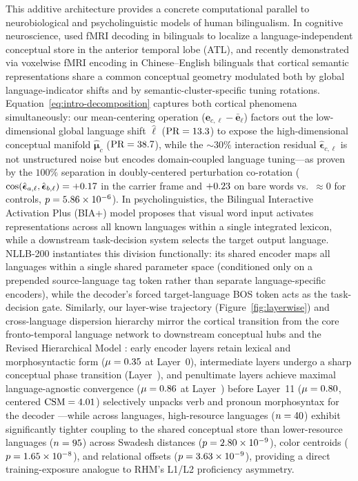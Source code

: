This additive architecture provides a concrete computational parallel to neurobiological and psycholinguistic models of human bilingualism.
In cognitive neuroscience, \citet{correia2014} used fMRI decoding in bilinguals to localize a language-independent conceptual store in the anterior temporal lobe (ATL), and \citet{deniz2025} recently demonstrated via voxelwise fMRI encoding in Chinese--English bilinguals that cortical semantic representations share a common conceptual geometry modulated both by global language-indicator shifts and by semantic-cluster-specific tuning rotations.
Equation~\ref{eq:intro-decomposition} captures both cortical phenomena simultaneously: our mean-centering operation ($\mathbf{e}_{c,\ell} - \bar{\mathbf{e}}_\ell$) factors out the low-dimensional global language shift $\hat{\boldsymbol{\ell}}$ ($\text{PR} = 13.3{}$) to expose the high-dimensional conceptual manifold $\hat{\boldsymbol{\mu}}_c$ ($\text{PR} = 38.7{}$), while the $\sim 30\%$ interaction residual $\hat{\boldsymbol{\epsilon}}_{c,\ell}$ is not unstructured noise but encodes domain-coupled language tuning—as proven by the $100\%$ separation in doubly-centered perturbation co-rotation ($\cos(\hat{\boldsymbol{\epsilon}}_{a,\ell}, \hat{\boldsymbol{\epsilon}}_{b,\ell}) = +0.17{}$ in the carrier frame and $+0.23{}$ on bare words vs.\ $\approx 0$ for controls, $p = 5.86 \times 10^{-6}{}$).
In psycholinguistics, the Bilingual Interactive Activation Plus (BIA+) model \citep{dijkstra2002} proposes that visual word input activates representations across all known languages within a single integrated lexicon, while a downstream task-decision system selects the target output language.
NLLB-200 instantiates this division functionally: its shared encoder maps all \NumLanguages{} languages within a single shared parameter space (conditioned only on a prepended source-language tag token rather than separate language-specific encoders), while the decoder's forced target-language BOS token acts as the task-decision gate.
Similarly, our layer-wise trajectory (Figure~\ref{fig:layerwise}) and cross-language dispersion hierarchy mirror the cortical transition from the core fronto-temporal language network \citep{malikmoraleda2022} to downstream conceptual hubs \citep{correia2014} and the Revised Hierarchical Model \citep{kroll1994,kroll2010}: early encoder layers retain lexical and morphosyntactic form ($\mu = 0.35{}$ at Layer~0), intermediate layers undergo a sharp conceptual phase transition (Layer~\LayerwisePhaseTrans{}), and penultimate layers achieve maximal language-agnostic convergence ($\mu = 0.86{}$ at Layer~\LayerwisePeakLayer{}) before Layer~11 ($\mu = 0.80{}$, centered $\text{CSM} = 4.01{}$) selectively unpacks verb and pronoun morphosyntax for the decoder \citep{voita2019,voita2021}—while across languages, high-resource languages ($n = 40{}$) exhibit significantly tighter coupling to the shared conceptual store than lower-resource languages ($n = 95{}$) across Swadesh distances ($p = 2.80 \times 10^{-9}{}$), color centroids ($p = 1.65 \times 10^{-8}{}$), and relational offsets ($p = 3.63 \times 10^{-9}{}$), providing a direct training-exposure analogue to RHM's L1/L2 proficiency asymmetry.


